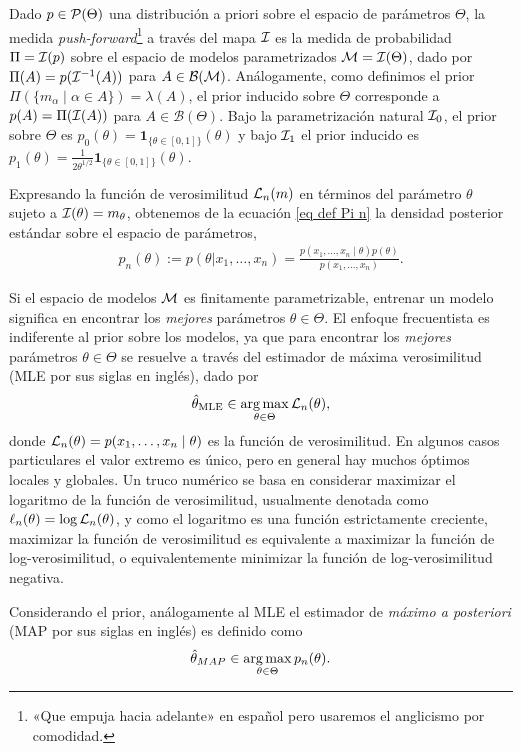Dado \(p \in \mathcal{P}(\Theta)\) una distribución a priori sobre el espacio de parámetros \(\Theta\), la medida \emph{push-forward}\footnote{«Que empuja hacia adelante» en español pero usaremos el anglicismo por comodidad.} a través del mapa \(\mathcal{I}\) es la medida de probabilidad \(\Pi=\mathcal{I}(p)\) sobre el espacio de modelos parametrizados \(\mathcal{M} = \mathcal{I}(\Theta)\), dado por \(\Pi(A)= p(\mathcal{I}^{-1}(A))\) para \(A \in \mathcal{B}(\mathcal{M})\). Análogamente, como definimos el prior \(\Pi(\{m_\alpha \mid \alpha \in A\}) = \lambda(A)\), el prior inducido sobre \(\Theta\) corresponde a \(p(A) = \Pi(\mathcal{I}(A)) \) para \(A \in \mathcal{B}(\Theta)\). Bajo la parametrización natural \(\mathcal{I}_0\), el prior sobre \(\Theta\) es \(p_0(\theta) = \mathbf{1}_{\{\theta \in [0,1]\}}(\theta)\) y bajo \(\mathcal{I}_1\) el prior inducido es \(p_1(\theta) = \frac{1}{2\theta^{1/2}}\mathbf{1}_{\{\theta \in [0,1]\}}(\theta)\).

Expresando la función de verosimilitud \(\mathcal{L}_n(m)\) en términos del parámetro \(\theta\) sujeto a \(\mathcal{I}(\theta) = m_\theta\), obtenemos de la ecuación \eqref{eq def Pi n} la densidad posterior estándar sobre el espacio de parámetros,  
\begin{align*}
	p_n(\theta) := p(\theta| x_1,\dots, x_n) = \frac{p(x_1,\dots, x_n \mid \theta) p(\theta)}{p(x_1, \dots, x_n)}.
\end{align*}

Si el espacio de modelos \(\mathcal{M}\) es finitamente parametrizable, entrenar un modelo significa en encontrar los \emph{mejores} parámetros \(\theta \in \Theta\). El enfoque frecuentista es indiferente al prior sobre los modelos, ya que para encontrar los \emph{mejores} parámetros \(\theta \in \Theta\) se resuelve a través del estimador de máxima verosimilitud (MLE por sus siglas en inglés), dado por
\[\hat\theta_{\mathrm{MLE}} \in \operatorname*{\arg\max}_{\theta \in \Theta} \mathcal{L}_n(\theta),\]
donde \(\mathcal{L}_n(\theta) = p(x_1, \dotsc, x_n \mid \theta)\) es la función de verosimilitud. En algunos casos particulares el valor extremo es único, pero en general hay muchos óptimos locales y globales. Un truco numérico se basa en considerar maximizar el logaritmo de la función de verosimilitud, usualmente denotada como \(\ell_n(\theta) = \log \mathcal{L}_n(\theta)\), y como el logaritmo es una función estrictamente creciente, maximizar la función de verosimilitud es equivalente a maximizar la función de log-verosimilitud, o equivalentemente minimizar la función de log-verosimilitud negativa.

Considerando el prior, análogamente al MLE el estimador de \emph{máximo a posteriori} (MAP por sus siglas en inglés) es definido como
\begin{align*}
	\hat\theta_{MAP} \in \operatorname*{\arg\max}_{\theta \in \Theta} p_n(\theta).
\end{align*}

